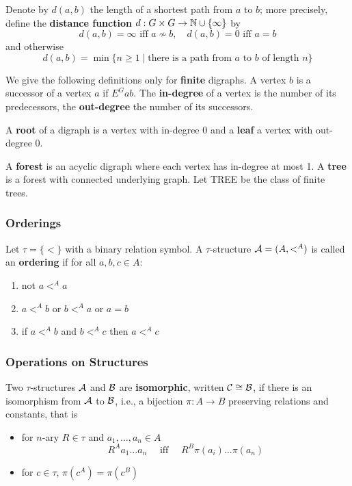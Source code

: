 \documentclass[11pt]{article}
\begin{document}
Denote by \(d(a,b)\) the length of a shortest path from \(a\) to \(b\); more
precisely, define the \textbf{distance function} \(d:G\times G\to\mathbb{N}\cup\{\infty\}\)
by
\begin{equation*}
d(a,b)=\infty\text{ iff }a\not\sim b,\quad d(a,b)=0\text{ iff }a=b
\end{equation*}
and otherwise
\begin{equation*}
d(a,b)=\min\{n\ge1\mid\text{there is a path from $a$ to $b$ of length $n$}\}
\end{equation*}

We give the following definitions only for \textbf{finite} digraphs. A vertex \(b\)
is a successor of a vertex \(a\) if \(E^Gab\). The \textbf{in-degree} of a vertex is
the number of its predecessors, the \textbf{out-degree} the number of its
successors.

A \textbf{root} of a digraph is a vertex with in-degree 0 and a \textbf{leaf} a vertex with
out-degree 0.

A \textbf{forest} is an acyclic digraph where each vertex has in-degree at most 1. A
\textbf{tree} is a forest with connected underlying graph. Let TREE be the class of
finite trees.

\subsubsection{Orderings}
\label{sec:org6b05999}
Let \(\tau=\{<\}\) with a binary relation symbol. A \(\tau\)-structure \(\mathcal{A}=(A,<^A)\) is
called an \textbf{ordering} if for all \(a,b,c\in A\):
\begin{enumerate}
\item not \(a<^A a\)
\item \(a<^A b\) or \(b<^A a\) or \(a=b\)
\item if \(a<^Ab\) and \(b<^Ac\) then \(a<^Ac\)
\end{enumerate}
\subsubsection{Operations on Structures}
\label{sec:orgf5b7775}
Two \(\tau\)-structures \(\mathcal{A}\) and \(\mathcal{B}\) are \textbf{isomorphic}, written \(\mathcal{C}\cong\mathcal{B}\), if
there is an isomorphism from \(\mathcal{A}\) to \(\mathcal{B}\), i.e., a bijection \(\pi:A\to B\) preserving
relations and constants, that is
\begin{itemize}
\item for \(n\)-ary \(R\in \tau\) and \(a_1,\dots,a_n\in A\)
\begin{equation*}
R^Aa_1\dots a_n \quad\text{ iff }\quad
R^B\pi(a_i)\dots\pi(a_n)
\end{equation*}
\item for \(c\in\tau\), \(\pi(c^A)=\pi(c^B)\)
\end{itemize}
\end{document}
